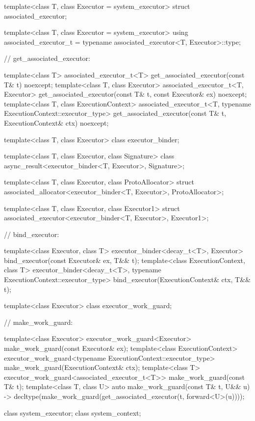 \begin{codeblock}
{{{{  template<class T, class Executor = system_executor>
    struct associated_executor;

  template<class T, class Executor = system_executor>
    using associated_executor_t = typename associated_executor<T, Executor>::type;

  // get_associated_executor:

  template<class T>
    associated_executor_t<T> get_associated_executor(const T& t) noexcept;
  template<class T, class Executor>
    associated_executor_t<T, Executor>
      get_associated_executor(const T& t, const Executor& ex) noexcept;
  template<class T, class ExecutionContext>
    associated_executor_t<T, typename ExecutionContext::executor_type>
      get_associated_executor(const T& t, ExecutionContext& ctx) noexcept;

  template<class T, class Executor>
    class executor_binder;

  template<class T, class Executor, class Signature>
    class async_result<executor_binder<T, Executor>, Signature>;

  template<class T, class Executor, class ProtoAllocator>
    struct associated_allocator<executor_binder<T, Executor>, ProtoAllocator>;

  template<class T, class Executor, class Executor1>
    struct associated_executor<executor_binder<T, Executor>, Executor1>;

  // bind_executor:

  template<class Executor, class T>
    executor_binder<decay_t<T>, Executor>
      bind_executor(const Executor& ex, T&& t);
  template<class ExecutionContext, class T>
    executor_binder<decay_t<T>, typename ExecutionContext::executor_type>
      bind_executor(ExecutionContext& ctx, T&& t);

  template<class Executor>
    class executor_work_guard;

  // make_work_guard:

  template<class Executor>
    executor_work_guard<Executor>
      make_work_guard(const Executor& ex);
  template<class ExecutionContext>
    executor_work_guard<typename ExecutionContext::executor_type>
      make_work_guard(ExecutionContext& ctx);
  template<class T>
    executor_work_guard<associated_executor_t<T>>
      make_work_guard(const T& t);
  template<class T, class U>
    auto make_work_guard(const T& t, U&& u)
      -> decltype(make_work_guard(get_associated_executor(t, forward<U>(u))));

  class system_executor;
  class system_context;

}}}}
\end{codeblock}
